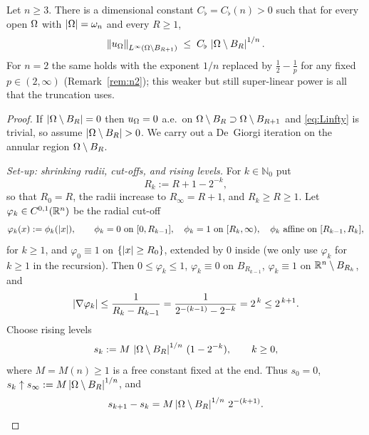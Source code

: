 \begin{lemma}\label{lem:Linfty}
Let $n\ge3$. There is a dimensional constant $C_\flat=C_\flat(n)>0$ such
that for every open $\Omega$ with $\left|\Omega\right|=\omega_n$ and every $R\ge1$,
\begin{equation}\label{eq:Linfty}
   \left\|u_\Omega\right\|_{L^\infty(\Omega\setminus B_{R+1})}
   \;\le\;C_\flat\,\left|\Omega\setminus B_R\right|^{1/n}.
\end{equation}
For $n=2$ the same holds with the exponent $1/n$ replaced by
$\tfrac12-\tfrac1p$ for any fixed $p\in(2,\infty)$
(Remark~\textup{\ref{rem:n2}}); this weaker but still super-linear power is
all that the truncation uses.
\end{lemma}

\begin{proof}
If $\left|\Omega\setminus B_R\right|=0$ then $u_\Omega=0$ a.e.\ on
$\Omega\setminus B_R\supset\Omega\setminus B_{R+1}$ and \eqref{eq:Linfty} is
trivial, so assume $\abs{\Om\setminus B_R}>0$. We carry out a De~Giorgi
iteration on the annular region $\Omega\setminus B_R$.

\smallskip
\emph{Set-up: shrinking radii, cut-offs, and rising levels.}
For $k\in\mathbb N_0$ put
\[
   R_k:=R+1-2^{-k},
\]
so that $R_0=R$, the radii increase to $R_\infty=R+1$, and
$R_k\ge R\ge1$. Let $\varphi_k\in C^{0,1}(\mathbb R^n)$ be the radial cut-off
\[
   \varphi_k(x):=\phi_k(\left|x\right|),\qquad
   \phi_k=0\ \text{on}\ [0,R_{k-1}],\quad
   \phi_k=1\ \text{on}\ [R_k,\infty),\quad
   \phi_k\ \text{affine on}\ [R_{k-1},R_k],
\]
for $k\ge1$, and $\varphi_0\equiv1$ on $\{\left|x\right|\ge R_0\}$, extended by
$0$ inside (we only use $\varphi_k$ for $k\ge1$ in the recursion). Then
$0\le\varphi_k\le1$, $\varphi_k\equiv0$ on $B_{R_{k-1}}$, $\varphi_k\equiv1$
on $\mathbb R^n\setminus B_{R_k}$, and
\[
   \left|\nabla\varphi_k\right|\le\frac1{R_k-R_{k-1}}
   =\frac1{2^{-(k-1)}-2^{-k}}=2^{\,k}\le 2^{\,k+1}.
\]
Choose rising levels
\[
   s_k:=M\,\left|\Omega\setminus B_R\right|^{1/n}\,(1-2^{-k}),\qquad k\ge0,
\]
where $M=M(n)\ge1$ is a free constant fixed at the end. Thus $s_0=0$,
$s_k\uparrow s_\infty:=M\left|\Omega\setminus B_R\right|^{1/n}$, and
\begin{equation}\label{eq:s-diff}
   s_{k+1}-s_k=M\left|\Omega\setminus B_R\right|^{1/n}\,2^{-(k+1)} .
\end{equation}


\end{proof}
